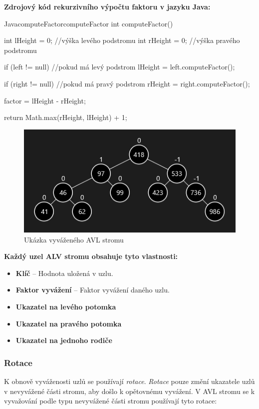 \documentclass[
  biblatex=false,
  font=serif,
  glossaries=false,
  tables=false,
  theorems=false,
  index
]{kidiplom}
\begin{document}
\newpage\noindent \textbf{Zdrojový kód rekurzivního výpočtu faktoru v jazyku Java:}

\begin{kicode}{Java}{computeFactor}{computeFactor}
int computeFactor() {		
	int lHeight = 0; //výška levého podstromu
	int rHeight = 0; //výška pravého podstromu
		
	if (left != null) { //pokud má levý podstrom
		lHeight = left.computeFactor();
	}
		
	if (right != null) { //pokud má pravý podstrom
		rHeight = right.computeFactor();
	}		
		
	factor = lHeight - rHeight; 
		
	return Math.max(rHeight, lHeight) + 1;		
}
\end{kicode} 

\begin{figure}[h!]
\centering
	\includegraphics[scale=1]{obrazky/10AVLUkazka.png}
	\caption{Ukázka vyváženého AVL stromu}
\end{figure}


\noindent\textbf{Každý uzel ALV stromu obsahuje tyto vlastnosti:}
\begin{itemize}
\item \textbf{Klíč} -- Hodnota uložená v uzlu.
\item \textbf{Faktor vyvážení} -- Faktor vyvážení daného uzlu.
\item \textbf{Ukazatel na levého potomka}
\item \textbf{Ukazatel na pravého potomka}
\item \textbf{Ukazatel na jednoho rodiče}
\end{itemize}

\subsubsection{Rotace}
\indent\indent K obnově vyváženosti uzlů se používají \textit{rotace}. \textit{Rotace} pouze změní ukazatele uzlů v nevyvážené části stromu, aby došlo k opětovnému vyvážení. V AVL stromu se k vyvažování podle typu nevyvážené části stromu používají tyto rotace:\\
\end{document}
